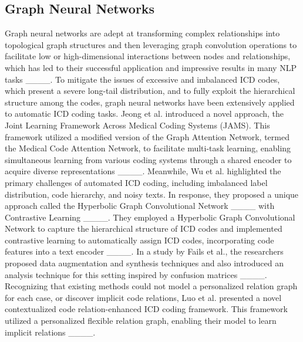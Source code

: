 \subsection{Graph Neural Networks}
Graph neural networks are adept at transforming complex relationships into topological graph structures and then leveraging graph convolution operations to facilitate low or high-dimensional interactions between nodes and relationships, which has led to their successful application and impressive results in many NLP tasks ____. To mitigate the issues of excessive and imbalanced ICD codes, which present a severe long-tail distribution, and to fully exploit the hierarchical structure among the codes, graph neural networks have been extensively applied to automatic ICD coding tasks. Jeong et al. introduced a novel approach, the Joint Learning Framework Across Medical Coding Systems (JAMS). This framework utilized a modified version of the Graph Attention Network, termed the Medical Code Attention Network, to facilitate multi-task learning, enabling simultaneous learning from various coding systems through a shared encoder to acquire diverse representations ____. Meanwhile, Wu et al. highlighted the primary challenges of automated ICD coding, including imbalanced label distribution, code hierarchy, and noisy texts. In response, they proposed a unique approach called the Hyperbolic Graph Convolutional Network ____ with Contrastive Learning ____. They employed a Hyperbolic Graph Convolutional Network to capture the hierarchical structure of ICD codes and implemented contrastive learning to automatically assign ICD codes, incorporating code features into a text encoder ____. In a study by Fails et al., the researchers proposed data augmentation and synthesis techniques and also introduced an analysis technique for this setting inspired by confusion matrices ____. Recognizing that existing methods could not model a personalized relation graph for each case, or discover implicit code relations, Luo et al. presented a novel contextualized code relation-enhanced ICD coding framework. This framework utilized a personalized flexible relation graph, enabling their model to learn implicit relations ____.

